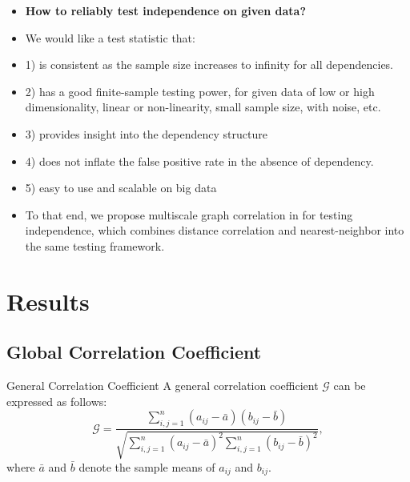 \documentclass{beamer}
\newcommand{\G}{\mathcal{G}}
\begin{document}
\begin{frame}
\begin{itemize}[<+->]
\item \textbf{How to reliably test independence on given data?}
\item We would like a test statistic that:
\item 1) is consistent as the sample size increases to infinity for all dependencies.
\item 2) has a good finite-sample testing power, for given data of low or high dimensionality, linear or non-linearity, small sample size, with noise, etc.
\item 3) provides insight into the dependency structure
\item 4) does not inflate the false positive rate in the absence of dependency.
\item 5) easy to use and scalable on big data
\item To that end, we propose multiscale graph correlation in \cite{ShenEtAl2016} for testing independence, which combines distance correlation and nearest-neighbor into the same testing framework.
\end{itemize}
\end{frame}

\section{Results}
\subsection{Global Correlation Coefficient}
\begin{frame}{General Correlation Coefficient}
A general correlation coefficient $\G$ can be expressed as follows:
\begin{equation}
\label{generalCoef}
\G=\frac{\sum_{i,j=1}^n (a_{ij}-\bar{a}) (b_{ij}-\bar{b})}{\sqrt{\sum_{i,j=1}^n  (a_{ij}-\bar{a})^{2} \sum_{i,j=1}^n (b_{ij}-\bar{b})^{2}}}, 
\end{equation}
where $\bar{a}$ and $\bar{b}$ denote the sample means of $a_{ij}$ and $b_{ij}$.
\end{frame}
\end{document}
